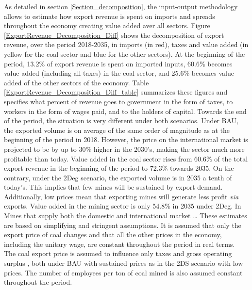 \documentclass[12pt,english]{article}
\begin{document}
As detailed in section \ref{Section_decomposition}, the input-output methodology allows to estimate how export revenue is spent on imports and spreads throughout the economy creating value added aver all sectors. Figure \ref{ExportRevenue_Decomposition_Diff} shows the decomposition of export revenue, over the period 2018-2035, in imports (in red), taxes and value added (in yellow for the coal sector and blue for the other sectors). %
At the beginning of the period, 13.2\% of export revenue is spent on imported inputs, 60.6\% becomes value added (including all taxes) %
in the coal sector, and 25.6\% becomes value added %
of the other sectors of the economy. Table \ref{ExportRevenue_Decomposition_Diff_table} summarizes these figures and specifies what percent of revenue goes to government in the form of taxes, to workers in the form of wages paid, and to the holders of capital. 
Towards the end of the period, the situation is very different under both scenarios. %
Under BAU, the exported volume is on average of the same order of magnitude as at the beginning of the period in 2018. However, the price on the international market is projected to be by up to 30\% higher in the 2030's, making the sector much more profitable than today. Value added in the coal sector rises from 60.6\% of the total export revenue in the beginning of the period to 72.3\% towards 2035. On the contrary, under the 2Deg scenario, the exported volume is in 2035 a tenth of today's. This implies that few mines will be sustained by export demand. Additionally, low prices mean that exporting mines will generate less profit \textit{via} exports. Value added in the mining sector is only 54.8\% in 2035 under 2Deg. In Mines that supply both the domestic and international market \ldots
These estimates are based on simplifying and stringent assumptions. It is assumed that only the export price of coal changes and that 
all the other prices in the economy, including the unitary wage, are constant throughout the period in real terms. The coal export price is assumed to influence only taxes and gross operating surplus %
, both under BAU with sustained prices as in the 2DS scenario with low prices. The number of employees per ton of coal mined is also assumed constant throughout the period.
\end{document}

